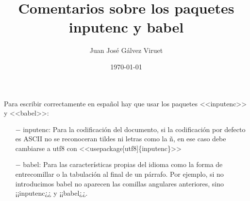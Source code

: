 \documentclass{article} %
\begin{document}
\title{Comentarios sobre los paquetes inputenc y babel}
\author{Juan José Gálvez Viruet}
\date{\today}
\maketitle
Para escribir correctamente en español hay que usar los paquetes <<inputenc>> y <<babel>>:
\begin{itemize}
\item[$-$] inputenc: Para la codificación del documento, si la codificación por defecto es ASCII no se reconoceran tildes ni letras como la ñ, en ese caso debe cambiarse a utf8 con <<usepackage[utf8]\{inputenc\}>>
\item[$-$] babel: Para las características propias del idioma como la forma de entrecomillar o la tabulación al final de un párrafo. Por ejemplo, si no introducimos babel no aparecen las comillas angulares anteriores, sino ¡¡inputenc¿¿ y ¡¡babel¿¿.
\end{itemize}
\end{document}
